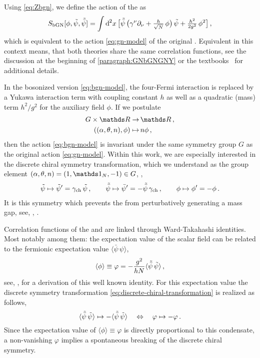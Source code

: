 Using \cref{eq:Zbgn}, we define the action of the \bgn{} as
\begin{align}
	S_\mathrm{bGN} [\phi,\Fpsi,\Fpsib] = \int \dif^{\,2}\! x \, \big[ \Fpsib \, \big( \gamma^\nu\partial_\nu + \tfrac{h}{\sqrt{N}} \, \phi \big) \, \Fpsi + \tfrac{h^2}{2 g^2} \, \phi^2 \big] \, ,	\label{eq:bgn-model}
\end{align}
which is equivalent to the action \cref{eq:gn-model} of the original \gnm{}.
Equivalent in this context means, that both theories share the same correlation functions, see the discussion at the beginning of \cref{paragraph:GNbGNGNY} or the textbooks~\cite{ZinnJustin:2002ru,Peskin:1995ev} for additional details. 
	
In the bosonized version \eqref{eq:bgn-model}, the four-Fermi interaction is replaced by a Yukawa interaction term with coupling constant $h$ as well as a quadratic (mass) term $h^2/g^2$ for the auxiliary field $\phi$.
If we postulate
\begin{subequations}\label{eq:bGNchiralSym}
\begin{align}
	G \times \Reals{} \to \, & \Reals{} \, ,\\
	( ( \alpha, \theta, n ), \phi ) \mapsto \, & n \phi \, ,	
\end{align}
\end{subequations}
then the action \eqref{eq:bgn-model} is invariant under the same symmetry group $G$ as the original action \eqref{eq:gn-model}.
Within this work, we are especially interested in the discrete chiral symmetry transformation, which we understand as the group element $(\alpha, \theta, n) = (1, \Id_N, -1) \in G$, \ie{},
	\begin{align}
		\tilde{\psi} \mapsto \tilde{\psi}^\prime = \gamma_\mathrm{ch} \, \tilde{\psi} \, ,	\qquad \tilde{\bar{\psi}} \mapsto \bar{\psi}^\prime = - \tilde{\bar{\psi}} \, \gamma_\mathrm{ch}\, ,\qquad	\phi \mapsto \phi^\prime = - \phi \, .\label{eq:discrete-chiral-transformation}
	\end{align}
It is this symmetry which prevents the \gnm{} from perturbatively generating a mass gap, see, \eg{}, .

Correlation functions of the \gn{} and \bgn{} are linked through Ward-Takahashi identities.
Most notably among them: the expectation value of the scalar field can be related to the fermionic expectation value $\langle \bar{\psi} \, \psi \rangle$,
	\begin{align}
		\langle \phi \rangle \equiv \varphi = -\frac{g^2}{h N} \langle \tilde{\bar{\psi}} \, \tilde{\psi} \rangle \, ,	\label{eq:sigm_eqofmotion} 
	\end{align}
see, \eg{},  for a derivation of this well known identity.
For this expectation value the discrete symmetry transformation \eqref{eq:discrete-chiral-transformation} is realized as follows,
	\begin{equation}
		\langle \tilde{\bar{\psi}} \, \tilde{\psi} \rangle \mapsto - \langle \tilde{\bar{\psi}} \, \tilde{\psi} \rangle \quad \Leftrightarrow \quad \varphi \mapsto -\varphi \, .
	\end{equation}
Since the expectation value of $\langle \phi \rangle \equiv \varphi$ is directly proportional to this condensate, a non-vanishing $\varphi$ implies a spontaneous breaking of the discrete chiral symmetry.\bigskip

